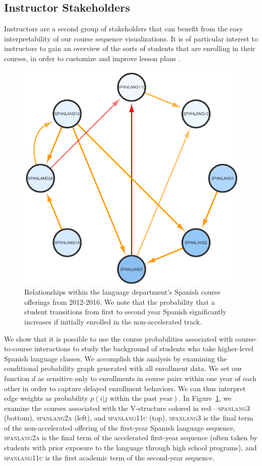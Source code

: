 \subsection{Instructor Stakeholders}
\label{sec:instructor_stakeholders}

Instructors are a second group of stakeholders that can benefit from
the easy interpretability of our course sequence visualizations. It is
of particular interest to instructors to gain an overview of the sorts
of students that are enrolling in their courses, in order to customize
and improve lesson plans \cite{Leaver2002}.

\begin{figure}[h]
    \centering
    \includegraphics[width=0.4\columnwidth]{Figs/final-spanlang.pdf}  
    \caption{Relationships within the language department's Spanish course offerings from 2012-2016. We note that the probability that a student transitions from first to second year Spanish significantly increases if initially enrolled in the non-accelerated track.}
    \label{fig:spanlang}
\end{figure}

We show that it is possible to use the course probabilities associated
with course-to-course interactions to study the background of students
who take higher-level Spanish language classes. We accomplish this
analysis by examining the conditional probability graph generated with
all enrollment data. We set our function $d$ as sensitive only to
enrollments in course pairs within one year of each other in order to
capture delayed enrollment behaviors. We can thus interpret edge
weights as probability $p(i|j \text{ within the past year})$. In
Figure~\ref{fig:spanlang}, we examine the courses associated with the
V-structure colored in red---\textsc{spanlang3} (bottom),
\textsc{spanlang2a} (left), and \textsc{spanlang11c}
(top). \textsc{spanlang3} is the final term of the non-accelerated
offering of the first-year Spanish language sequence,
\textsc{spanlang2a} is the final term of the accelerated first-year
sequence (often taken by students with prior exposure to the language
through high school programs), and \textsc{spanlang11c} is the first
academic term of the second-year sequence.


